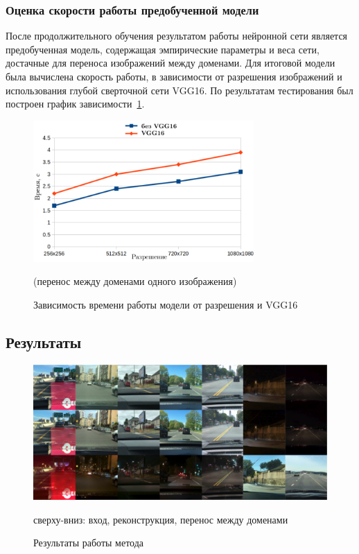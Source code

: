 \documentclass[11pt,a4paper]{extarticle}
\begin{document}
{		\subsubsection*{Оценка скорости работы предобученной модели}\label{sec:eval:speed}

			После продолжительного обучения результатом работы нейронной сети является предобученная модель, содержащая эмпирические параметры и веса сети, достачные для переноса изображений между доменами.
			Для итоговой модели была вычислена скорость работы, в зависимости от разрешения изображений и использования глубой сверточной сети VGG16.
			По результатам тестирования был построен график зависимости~\ref{pic:speedtest}.

			\begin{figure}[ht]
				\centering
				\includegraphics[width=0.75\textwidth]{img/speedtest}
				\caption{Зависимость времени работы модели от разрешения и VGG16}{
					(перенос между доменами одного изображения)
				}
				\label{pic:speedtest}
			\end{figure}
			
			
	\newpage
	\subsection{Результаты}\label{sec:results}

		\begin{figure}[ht]
			\centering
			\includegraphics[width=\textwidth]{img/results}
			\caption{Результаты работы метода}{
				\small{
					сверху-вниз: вход, реконструкция, перенос между доменами
				}
			}
		\end{figure}


}
\end{document}
